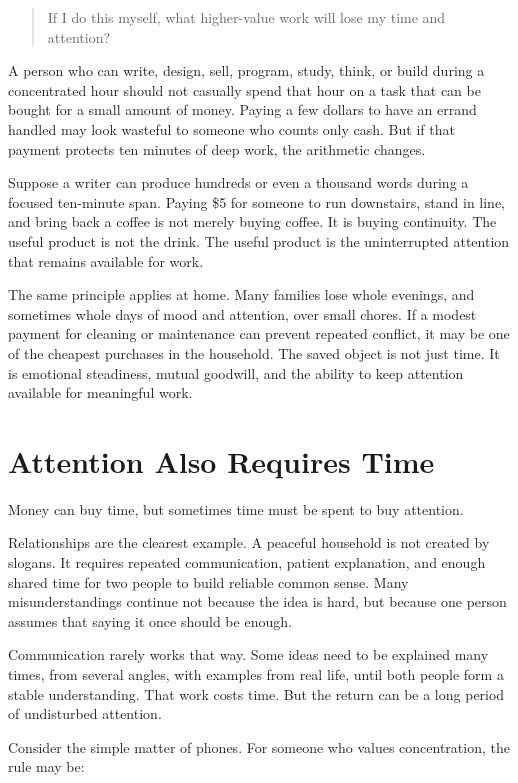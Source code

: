 \begin{quote}
If I do this myself, what higher-value work will lose my time and attention?
\end{quote}

A person who can write, design, sell, program, study, think, or build during a concentrated hour should not casually spend that hour on a task that can be bought for a small amount of money. Paying a few dollars to have an errand handled may look wasteful to someone who counts only cash. But if that payment protects ten minutes of deep work, the arithmetic changes.

Suppose a writer can produce hundreds or even a thousand words during a focused ten-minute span. Paying \$5 for someone to run downstairs, stand in line, and bring back a coffee is not merely buying coffee. It is buying continuity. The useful product is not the drink. The useful product is the uninterrupted attention that remains available for work.

The same principle applies at home. Many families lose whole evenings, and sometimes whole days of mood and attention, over small chores. If a modest payment for cleaning or maintenance can prevent repeated conflict, it may be one of the cheapest purchases in the household. The saved object is not just time. It is emotional steadiness, mutual goodwill, and the ability to keep attention available for meaningful work.

\section*{Attention Also Requires Time}

Money can buy time, but sometimes time must be spent to buy attention.

Relationships are the clearest example. A peaceful household is not created by slogans. It requires repeated communication, patient explanation, and enough shared time for two people to build reliable common sense. Many misunderstandings continue not because the idea is hard, but because one person assumes that saying it once should be enough.

Communication rarely works that way. Some ideas need to be explained many times, from several angles, with examples from real life, until both people form a stable understanding. That work costs time. But the return can be a long period of undisturbed attention.

Consider the simple matter of phones. For someone who values concentration, the rule may be:

